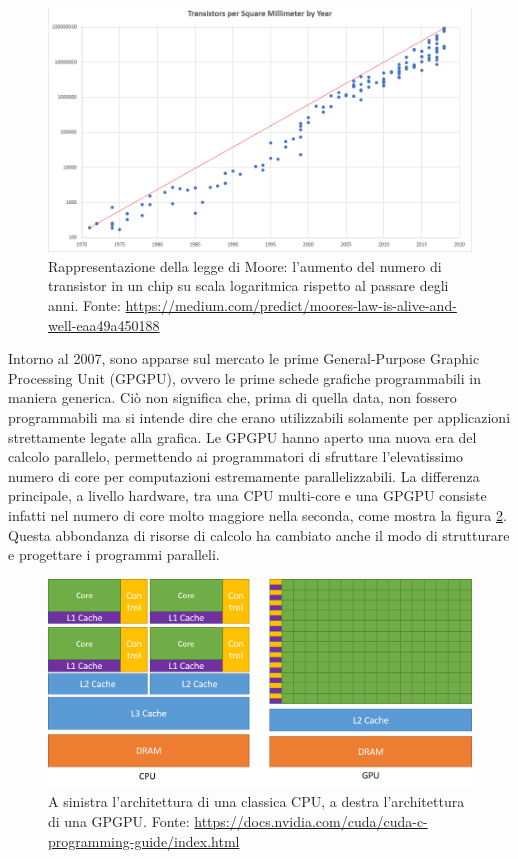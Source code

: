 \documentclass[12pt,a4paper,oneside]{book}
\begin{document}
	\begin{figure}[!ht]
		\centering
		\includegraphics[width=0.76\linewidth]{Moores_Law}
		\caption[Legge di Moore]{Rappresentazione della legge di Moore: l'aumento del numero di transistor in un chip su scala logaritmica rispetto al passare degli anni. Fonte: \url{https://medium.com/predict/moores-law-is-alive-and-well-eaa49a450188}}
		\label{fig:mooreslaw}
	\end{figure}
	
	Intorno al 2007, sono apparse sul mercato le prime General-Purpose Graphic Processing Unit (GPGPU), ovvero le prime schede grafiche programmabili in maniera generica. Ciò non significa che, prima di quella data, non fossero programmabili ma si intende dire che erano utilizzabili solamente per applicazioni strettamente legate alla grafica. Le GPGPU hanno aperto una nuova era del calcolo parallelo, permettendo ai programmatori di sfruttare l'elevatissimo numero di core per computazioni estremamente parallelizzabili. La differenza principale, a livello hardware, tra una CPU multi-core e una GPGPU consiste infatti nel numero di core molto maggiore nella seconda, come mostra la figura \ref{fig:cpu-gpu-computing-architecture}. Questa abbondanza di risorse di calcolo ha cambiato anche il modo di strutturare e progettare i programmi paralleli.
	
	\begin{figure}[!ht]
		\centering
		\includegraphics[width=\linewidth]{cpu-gpu-computing-architecture}
		\caption[Differenza architetturale tra CPU e GPU]{A sinistra l'architettura di una classica CPU, a destra l'architettura di una GPGPU. Fonte: \url{https://docs.nvidia.com/cuda/cuda-c-programming-guide/index.html}}
		\label{fig:cpu-gpu-computing-architecture}
	\end{figure}
	
\end{document}
